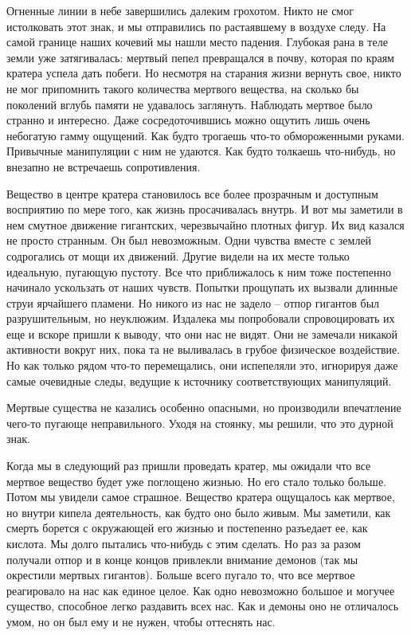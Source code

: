 \documentclass[12pt,a4paper]{article}
\begin{document}
Огненные линии в небе завершились далеким грохотом. Никто не смог истолковать этот знак, и мы отправились по растаявшему в воздухе следу. На самой границе наших кочевий мы нашли место падения. Глубокая рана в теле земли уже затягивалась: мертвый пепел превращался в почву, которая по краям кратера успела дать побеги. Но несмотря на старания жизни вернуть свое, никто не мог припомнить такого количества мертвого вещества, на сколько бы поколений вглубь памяти не удавалось заглянуть. Наблюдать мертвое было странно и интересно. Даже сосредоточившись можно ощутить лишь очень небогатую гамму ощущений. Как будто трогаешь что-то обмороженными руками. Привычные манипуляции с ним не удаются. Как будто толкаешь что-нибудь, но внезапно не встречаешь сопротивления.

Вещество в центре кратера становилось все более прозрачным и доступным восприятию по мере того, как жизнь просачивалась внутрь. И вот мы заметили в нем смутное движение гигантских, черезвычайно плотных фигур. Их вид казался не просто странным. Он был невозможным. Одни чувства вместе с землей содрогались от мощи их движений. Другие видели на их месте только идеальную, пугающую пустоту. Все что приближалось к ним тоже постепенно начинало ускользать от наших чувств. Попытки прощупать их вызвали длинные струи ярчайшего пламени. Но никого из нас не задело -- отпор гигантов был разрушительным, но неуклюжим. Издалека мы попробовали спровоцировать их еще и вскоре пришли к выводу, что они нас не видят. Они не замечали никакой активности вокруг них, пока та не выливалась в грубое физическое воздействие. Но как только рядом что-то перемещались, они испепеляли это, игнорируя даже самые очевидные следы, ведущие к источнику соответствующих манипуляций.

Мертвые существа не казались особенно опасными, но производили впечатление чего-то пугающе неправильного. Уходя на стоянку, мы решили, что это дурной знак.

Когда мы в следующий раз пришли проведать кратер, мы ожидали что все мертвое вещество будет уже поглощено жизнью. Но его стало только больше. Потом мы увидели самое страшное. Вещество кратера ощущалось как мертвое, но внутри кипела деятельность, как будто оно было живым. Мы заметили, как смерть борется с окружающей его жизнью и постепенно разъедает ее, как кислота. Мы долго пытались что-нибудь с этим сделать. Но раз за разом получали отпор и в конце концов привлекли внимание демонов (так мы окрестили мертвых гигантов). Больше всего пугало то, что все мертвое реагировало на нас как единое целое. Как одно невозможно большое и могучее существо, способное легко раздавить всех нас. Как и демоны оно не отличалось умом, но он был ему и не нужен, чтобы оттеснять нас.
\end{document}
